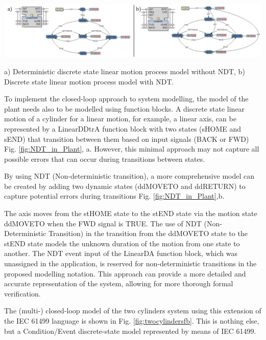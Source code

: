 \documentclass[runningheads]{llncs}
\begin{document}
\begin {figure*}
    \centering
    \includegraphics [width = 1 \textwidth] {images/NDT_linear.PNG}
    \caption {a) Deterministic discrete state linear motion process model without NDT, b) Discrete state linear motion process model with NDT.}
    \label {fig:NDT_in_Plant}
\end {figure*}

To implement the closed-loop approach to system modelling, the model of the plant needs also to be modelled using function blocks. A discrete state linear motion of a cylinder for a linear motion, for example, a linear axis, can be represented by a LinearDDtrA function block with two states (sHOME and sEND) that transition between them based on input signals (BACK or FWD) Fig. \ref{fig:NDT_in_Plant}, a. However, this minimal approach may not capture all possible errors that can occur during transitions between states. 

By using NDT (Non-deterministic transition), a more comprehensive model can be created by adding two dynamic states (ddMOVETO and ddRETURN) to capture potential errors during transitions Fig. \ref{fig:NDT_in_Plant},b.

The axis moves from the stHOME state to the stEND state via the motion state ddMOVETO when the FWD signal is TRUE. The use of NDT (Non-Deterministic Transition) in the transition from the ddMOVETO state to the stEND state models the unknown duration of the motion from one state to another. The NDT event input of the LinearDA function block, which was unassigned in the application, is reserved for non-deterministic transitions in the proposed modelling notation. This approach can provide a more detailed and accurate representation of the system, allowing for more thorough formal verification. 

The (multi-) closed-loop model of the two cylinders system using this extension of the IEC 61499 language is shown in Fig. \ref{fig:twocylindersfb}. This is nothing else, but a Condition/Event discrete-state model represented by means of IEC 61499. 
\end{document}
